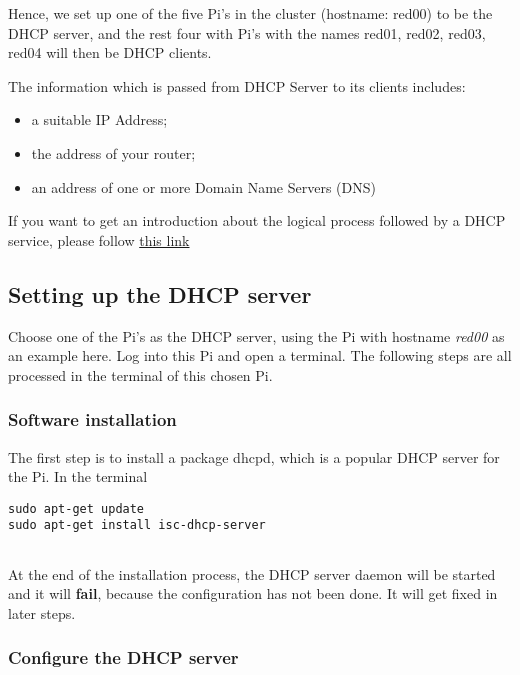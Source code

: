 Hence, we set up one of the five Pi's in the cluster (hostname: red00)
to be the DHCP server, and the rest four with Pi's with the names red01,
red02, red03, red04 will then be DHCP clients.

The information which is passed from DHCP Server to its clients
includes\cite{hid-sp18-405-tutorial-pidhcp-pdf}:

\begin{itemize}
\item
  a suitable IP Address;
\item
  the address of your router;
\item
  an address of one or more Domain Name Servers (DNS)
\end{itemize}

If you want to get an introduction about the logical process followed by
a DHCP service, please follow
\href{https://www.raspberrypi.org/learning/networking-lessons/lesson-3/plan/}{this
link} \cite{hid-sp18-405-tutorial-pidhcp-lesson3}

\subsection{Setting up the DHCP server}

Choose one of the Pi's as the DHCP server, using the Pi with hostname
\emph{red00} as an example here. Log into this Pi and open a terminal.
The following steps are all processed in the terminal of this chosen Pi.

\subsubsection{Software installation}

The first step is to install a package dhcpd, which is a popular DHCP
server for the Pi. In the terminal

\begin{lstlisting}
sudo apt-get update
sudo apt-get install isc-dhcp-server
    
\end{lstlisting}

At the end of the installation process, the DHCP server daemon will be
started and it will \textbf{fail}, because the configuration has not
been done. It will get fixed in later steps.

\subsubsection{Configure the DHCP server}

